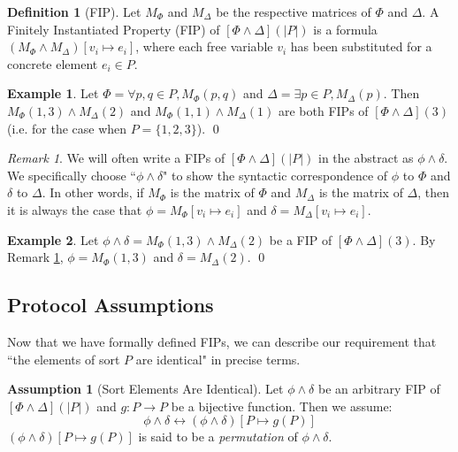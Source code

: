 \documentclass[12pt]{article}
\theoremstyle{definition}
\newtheorem{assumption}{Assumption}
\newtheorem{definition}{Definition}
\newtheorem{example}{Example}
\theoremstyle{remark}
\newtheorem{remark}{Remark}
\begin{document}
\begin{definition}[FIP]
  Let $M_{\Phi}$ and $M_{\Delta}$ be the respective matrices of $\Phi$ and $\Delta$.  A Finitely Instantiated Property (FIP) of $[\Phi\land\Delta](|P|)$ is a formula $(M_{\Phi} \land M_{\Delta})[v_i \mapsto e_i]$, where each free variable $v_i$ has been substituted for a concrete element $e_i \in P$.  
\end{definition}

\begin{example}
  Let $\Phi = \forall p,q \in P, M_{\Phi}(p,q)$ and $\Delta = \exists p \in P, M_{\Delta}(p)$.  Then $M_{\Phi}(1,3) \land M_{\Delta}(2)$ and $M_{\Phi}(1,1) \land M_{\Delta}(1)$ are both FIPs of $[\Phi\land\Delta](3)$ (i.e. for the case when $P=\{1,2,3\}$).  
  \qed
\end{example}

\begin{remark}
  \label{rmk:fip-syntax}
  We will often write a FIPs of $[\Phi\land\Delta](|P|)$ in the abstract as $\phi\land\delta$.  We specifically choose ``$\phi\land\delta$" to show the syntactic correspondence of $\phi$ to $\Phi$ and $\delta$ to $\Delta$.  In other words, if $M_{\Phi}$ is the matrix of $\Phi$ and $M_{\Delta}$ is the matrix of $\Delta$, then it is always the case that $\phi = M_{\Phi}[v_i \mapsto e_i]$ and $\delta = M_{\Delta}[v_i \mapsto e_i]$.
\end{remark}

\begin{example}
  Let $\phi\land\delta = M_{\Phi}(1,3) \land M_{\Delta}(2)$ be a FIP of $[\Phi\land\Delta](3)$.  By Remark \ref{rmk:fip-syntax}, $\phi = M_{\Phi}(1,3)$ and $\delta = M_{\Delta}(2)$.
  \qed
\end{example}


\subsection{Protocol Assumptions}

Now that we have formally defined FIPs, we can describe our requirement that ``the elements of sort $P$ are identical" in precise terms.

\begin{assumption}[Sort Elements Are Identical]
  \label{asmp:perm}
  Let $\phi\land\delta$ be an arbitrary FIP of $[\Phi\land\Delta](|P|)$ and $g : P \to P$ be a bijective function.  Then we assume:
  $$\phi\land\delta \leftrightarrow (\phi\land\delta)[P \mapsto g(P)]$$
  $(\phi\land\delta)[P \mapsto g(P)]$ is said to be a \textit{permutation} of $\phi\land\delta$.
\end{assumption}
\end{document}
